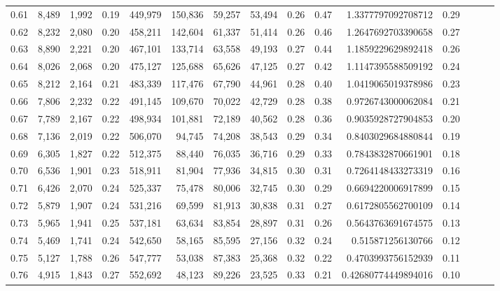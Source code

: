 \begin{tabular}{rrrrrrrrrrrrrrr}
0.61 &   8,489 &  1,992 &  0.19 &  449,979 &  150,836 &   59,257 &   53,494 &  0.26 &  0.47 &    1.3377797092708712 &      0.29 \\
0.62 &   8,232 &  2,080 &  0.20 &  458,211 &  142,604 &   61,337 &   51,414 &  0.26 &  0.46 &    1.2647692703390658 &      0.27 \\
0.63 &   8,890 &  2,221 &  0.20 &  467,101 &  133,714 &   63,558 &   49,193 &  0.27 &  0.44 &    1.1859229629892418 &      0.26 \\
0.64 &   8,026 &  2,068 &  0.20 &  475,127 &  125,688 &   65,626 &   47,125 &  0.27 &  0.42 &    1.1147395588509192 &      0.24 \\
0.65 &   8,212 &  2,164 &  0.21 &  483,339 &  117,476 &   67,790 &   44,961 &  0.28 &  0.40 &    1.0419065019378986 &      0.23 \\
0.66 &   7,806 &  2,232 &  0.22 &  491,145 &  109,670 &   70,022 &   42,729 &  0.28 &  0.38 &    0.9726743000062084 &      0.21 \\
0.67 &   7,789 &  2,167 &  0.22 &  498,934 &  101,881 &   72,189 &   40,562 &  0.28 &  0.36 &    0.9035928727904853 &      0.20 \\
0.68 &   7,136 &  2,019 &  0.22 &  506,070 &   94,745 &   74,208 &   38,543 &  0.29 &  0.34 &    0.8403029684880844 &      0.19 \\
0.69 &   6,305 &  1,827 &  0.22 &  512,375 &   88,440 &   76,035 &   36,716 &  0.29 &  0.33 &    0.7843832870661901 &      0.18 \\
0.70 &   6,536 &  1,901 &  0.23 &  518,911 &   81,904 &   77,936 &   34,815 &  0.30 &  0.31 &    0.7264148433273319 &      0.16 \\
0.71 &   6,426 &  2,070 &  0.24 &  525,337 &   75,478 &   80,006 &   32,745 &  0.30 &  0.29 &    0.6694220006917899 &      0.15 \\
0.72 &   5,879 &  1,907 &  0.24 &  531,216 &   69,599 &   81,913 &   30,838 &  0.31 &  0.27 &    0.6172805562700109 &      0.14 \\
0.73 &   5,965 &  1,941 &  0.25 &  537,181 &   63,634 &   83,854 &   28,897 &  0.31 &  0.26 &    0.5643763691674575 &      0.13 \\
0.74 &   5,469 &  1,741 &  0.24 &  542,650 &   58,165 &   85,595 &   27,156 &  0.32 &  0.24 &     0.515871256130766 &      0.12 \\
0.75 &   5,127 &  1,788 &  0.26 &  547,777 &   53,038 &   87,383 &   25,368 &  0.32 &  0.22 &    0.4703993756152939 &      0.11 \\
0.76 &   4,915 &  1,843 &  0.27 &  552,692 &   48,123 &   89,226 &   23,525 &  0.33 &  0.21 &   0.42680774449894016 &      0.10 \\

\end{tabular}
